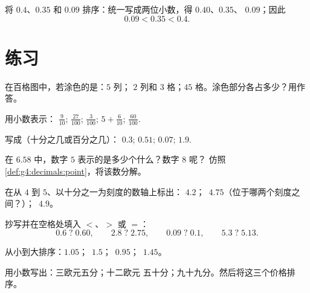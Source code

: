 \begin{example}\label{ex:g4:decimals:compare}
将 $0.4$、$0.35$ 和 $0.09$ 排序：统一写成两位小数，得 $0.40$、$0.35$、
$0.09$；因此
\[
0.09 < 0.35 < 0.4 .
\]
\end{example}

\section{练习}

\begin{exercise}[$\star$]\label{exo:g4:decimals:1}
在百格图中，若涂色的是：$5$ 列；
$2$ 列和 $3$ 格；$45$ 格。涂色部分各占多少？用作答。
\end{exercise}

\begin{exercise}[$\star$]\label{exo:g4:decimals:2}
用小数表示：
$\frac{9}{10}$; \quad $\frac{27}{100}$; \quad $\frac{3}{100}$; \quad
$5 + \frac{6}{10}$; \quad $\frac{60}{100}$.
\end{exercise}

\begin{exercise}[$\star$]\label{exo:g4:decimals:3}
写成（十分之几或百分之几）：
$0.3$; \quad $0.51$; \quad $0.07$; \quad $1.9$.
\end{exercise}

\begin{exercise}[$\star$]\label{exo:g4:decimals:4}
在 $6.58$ 中，数字 $5$ 表示的是多少个什么？数字 $8$ 呢？
仿照\cref{def:g4:decimals:point}，将该数分解。
\end{exercise}

\begin{exercise}[$\star$]\label{exo:g4:decimals:5}
在从 $4$ 到 $5$、以十分之一为刻度的数轴上标出：
$4.2$；\ $4.75$（位于哪两个刻度之间？）；\ $4.9$。
\end{exercise}

\begin{exercise}[$\star$]\label{exo:g4:decimals:6}
抄写并在空格处填入 $<$、$>$ 或 $=$：
\[
0.6 \;?\; 0.60, \qquad
2.8 \;?\; 2.75, \qquad
0.09 \;?\; 0.1, \qquad
5.3 \;?\; 5.13 .
\]
\end{exercise}

\begin{exercise}[$\star$]\label{exo:g4:decimals:7}
从小到大排序：$1.05$；\ $1.5$；\ $0.95$；\ $1.45$。
\end{exercise}

\begin{exercise}[$\star$]\label{exo:g4:decimals:8}
用小数写出：三欧元五分；十二欧元
五十分；九十九分。然后将这三个价格排序。
\end{exercise}

